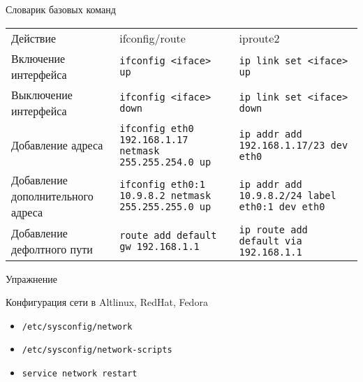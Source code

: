 \documentclass[ignorenonframetext, professionalfonts, hyperref={pdftex, unicode}]{beamer}
\begin{document}
\begin{frame}{Словарик базовых команд}
  \begin{small}
  \begin{tabular}{|l|l|l|}
    Действие & ifconfig/route & iproute2 \\
    Включение интерфейса & {\tt ifconfig <iface> up} & {\tt ip link set <iface> up} \\
  Выключение интерфейса & {\tt ifconfig <iface> down}  & {\tt ip link set <iface> down} \\
          Добавление адреса & {\tt ifconfig eth0 192.168.1.17 netmask 255.255.254.0 up} & {\tt ip addr add 192.168.1.17/23 dev eth0} \\
     Добавление дополнительного адреса & {\tt ifconfig eth0:1 10.9.8.2 netmask 255.255.255.0 up} & {\tt ip addr add 10.9.8.2/24 label eth0:1 dev eth0}\\
     Добавление дефолтного пути & {\tt route add default gw 192.168.1.1} & {\tt ip route add default via 192.168.1.1} \\
  \end{tabular}
\end{small}
\end{frame}
\begin{frame}{Упражнение}
\end{frame}
\begin{frame}{Конфигурация сети в Altlinux, RedHat, Fedora}
  \begin{itemize}
    \item {\tt /etc/sysconfig/network}
    \item {\tt /etc/sysconfig/network-scripts}
    \item {\tt service network restart}
  \end{itemize}
\end{frame}
\end{document}
